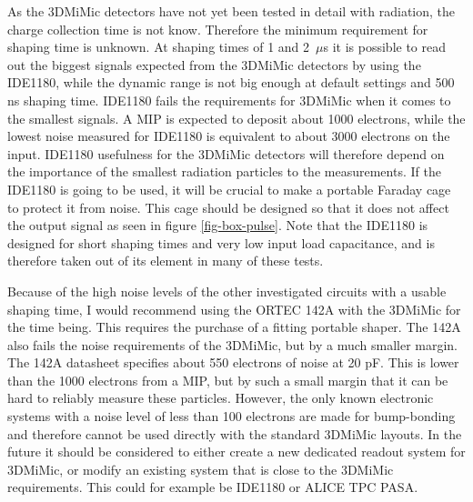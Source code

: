 \documentclass[../main/thesis.tex]{subfiles}
\begin{document}
As the 3DMiMic detectors have not yet been tested in detail with radiation, the charge collection time is not know. Therefore the minimum requirement for shaping time is unknown. At shaping times of 1 and 2~$\mu$s it is possible to read out the biggest signals expected from the 3DMiMic detectors by using the IDE1180, while the dynamic range is not big enough at default settings and 500 ns shaping time. IDE1180 fails the requirements for 3DMiMic when it comes to the smallest signals. A \acrlong{MIP} is expected to deposit about 1000 electrons, while the lowest noise measured for IDE1180 is equivalent to about 3000 electrons on the input. IDE1180 usefulness for the 3DMiMic detectors will therefore depend on the importance of the smallest radiation particles to the measurements. If the IDE1180 is going to be used, it will be crucial to make a portable Faraday cage to protect it from noise. This cage should be designed so that it does not affect the output signal as seen in figure \ref{fig-box-pulse}. Note that the IDE1180 is designed for short shaping times and very low input load capacitance, and is therefore taken out of its element in many of these tests. 

Because of the high noise levels of the other investigated circuits with a usable shaping time, I would recommend using the ORTEC 142A with the 3DMiMic for the time being. This requires the purchase of a fitting portable shaper. The 142A also fails the noise requirements of the 3DMiMic, but by a much smaller margin. The 142A datasheet specifies about 550 electrons of noise at 20 pF. This is lower than the 1000 electrons from a \gls{MIP}, but by such a small margin that it can be hard to reliably measure these particles. However, the only known electronic systems with a noise level of less than 100 electrons are made for bump-bonding and therefore cannot be used directly with the standard 3DMiMic layouts. In the future it should be considered to either create a new dedicated readout system for 3DMiMic, or modify an existing system that is close to the 3DMiMic requirements. This could for example be IDE1180 or ALICE TPC PASA. 
\end{document}
